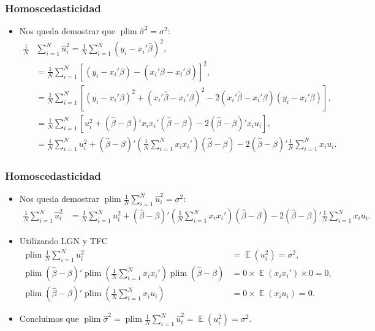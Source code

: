 \documentclass[t, compress, spanish, aspectratio=169]{beamer}
\DeclareMathOperator{\plim}{plim}
\DeclareMathOperator{\E}{\mathbb{E}}
\begin{document}
	\begin{frame}
			\frametitle{Homoscedasticidad}
			\begin{itemize}
				\item <1-> Nos queda demostrar que $\plim \hat \sigma^2 = \sigma^2$:
				\footnotesize
			\begin{align*}
				\frac{1}{N}&\sum_{i=1}^{N}\hat u_i^2  = \frac{1}{N}\sum_{i=1}^{N}(y_i-x_i'\hat \beta)^2,\\
				& = \frac{1}{N}\sum_{i=1}^{N} [(y_i-x_i'\beta)-(x_i'\hat \beta-x_i'\beta)]^2,\\
				& = \frac{1}{N}\sum_{i=1}^{N} [(y_i-x_i'\beta)^2+(x_i'\hat \beta-x_i'\beta)^2
				-2(x_i'\hat \beta-x_i'\beta)(y_i-x_i'\beta)],\\
				& = \frac{1}{N}\sum_{i=1}^{N} [u_i^2+(\hat \beta-\beta)'x_ix_i'(\hat \beta-\beta)
				-2 (\hat \beta-\beta)'x_i u_i],\\
				& = \frac{1}{N}\sum_{i=1}^{N} u_i^2+(\hat \beta-\beta)'\left(\frac{1}{N}\sum_{i=1}^{N}x_ix_i'\right)(\hat \beta-\beta)
				-2 (\hat \beta-\beta)'\frac{1}{N}\sum_{i=1}^{N}x_i u_i.
			\end{align*}
		\end{itemize}
	\end{frame}
	\begin{frame}
		\frametitle{Homoscedasticidad}
		\begin{itemize}
			\item Nos queda demostrar $\plim\frac{1}{N}\sum_{i=1}^{N}\hat u_i^2 = \sigma^2$:
			\footnotesize{
				\begin{align*}
					\frac{1}{N}\sum_{i=1}^{N}\hat u_i^2 & =\frac{1}{N}\sum_{i=1}^{N} u_i^2+(\hat \beta-\beta)'\left(\frac{1}{N}\sum_{i=1}^{N}x_ix_i'\right)(\hat \beta-\beta)
					-2 (\hat \beta-\beta)'\frac{1}{N}\sum_{i=1}^{N}x_i u_i.
				\end{align*}
			}
			\item [] Utilizando LGN y TFC
			\small{
				\begin{align*}
					\plim \frac{1}{N}\sum_{i=1}^{N}u_i^2 & =\E(u_i^2)=\sigma^2,\\
					\plim(\hat \beta-\beta)'\plim \left(\frac{1}{N}\sum_{i=1}^{N}x_ix_i'\right)\plim(\hat \beta-\beta)&= 0 \times \E(x_ix_i')\times 0 = 0,\\
					\plim(\hat \beta-\beta)'\plim \left(\frac{1}{N}\sum_{i=1}^{N}x_i u_i \right)&= 0 \times \E(x_i u_i)=0.
				\end{align*}
			}
			\item [] Concluimos que $\plim\hat \sigma^2 = \plim\frac{1}{N}\sum_{i=1}^{N}\hat u_i^2 = \E(u_i^2)=\sigma^2$.
		\end{itemize}
	\end{frame}
\end{document}

